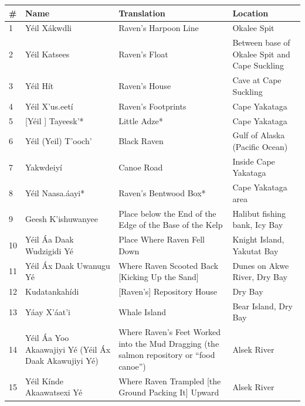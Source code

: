 \begin{table}[!h]
    \centering
		\small
    \begin{tabular}{l | L{3cm} | L{3cm} | L{4cm}}
\textbf{\#} & \textbf{Name} & \textbf{Translation} & \textbf{Location}  \\
\toprule

1&Yéil Xákwdli
&Raven’s Harpoon Line
&Okalee Spit \\

2
&Yéil Katsees
&Raven’s Float
&Between base of Okalee Spit and Cape Suckling \\

3
&Yéil Hít
&Raven’s House
&Cave at Cape Suckling  \\

4
&Yéil X'us.eetí
&Raven’s Footprints
&Cape Yakataga \\

5
&[Yéil ] Tayeesk'*
&Little Adze*
&Cape Yakataga  \\
6
&Yéil (Yeil) T'ooch'
&Black Raven
&Gulf of Alaska (Pacific Ocean) \\

7
&Yakwdeiyí
&Canoe Road
&Inside Cape Yakataga \\
8
&Yéil Naasa.áayi*
&Raven’s Bentwood Box*
&Cape Yakataga area  \\
9
&Geesh K'ishuwanyee
&Place below the End of the Edge of the Base of the Kelp
&Halibut fishing bank, Icy Bay \\

10
&Yéil Áa Daak Wudzigidi Yé
&Place Where Raven Fell Down
&Knight Island, Yakutat Bay \\

11
&Yéil Áx Daak Uwanugu Yé
&Where Raven Scooted Back [Kicking Up the Sand]
&Dunes on Akwe River, Dry Bay \\

12
&Kudatankahídi
&[Raven’s] Repository House
&Dry Bay \\

13&Yáay X’áat’i&Whale Island&Bear Island, Dry Bay \\

14 &Yéil Áa Yoo Akaawajiyi Yé
(Yéil Áx Daak Akawujiyi Yé) &Where Raven’s Feet Worked into the Mud Dragging (the salmon repository or “food canoe”)
&Alsek River \\

15
&Yéil Kínde Akaawatsexi Yé
&Where Raven Trampled [the Ground Packing It] Upward
&Alsek River \\


\end{tabular}
\end{table}

